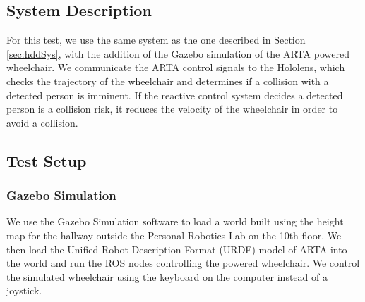\subsection{System Description}
For this test, we use the same system as the one described in Section \ref{sec:hddSys}, with the addition of the Gazebo simulation of the ARTA powered wheelchair. We communicate the ARTA control signals to the Hololens, which checks the trajectory of the wheelchair and determines if a collision with a detected person is imminent. If the reactive control system decides a detected person is a collision risk, it reduces the velocity of the wheelchair in order to avoid a collision.

\subsection{Test Setup}

\subsubsection{Gazebo Simulation}
We use the Gazebo Simulation software to load a world built using the height map for the hallway outside the Personal Robotics Lab on the 10th floor. We then load the Unified Robot Description Format (URDF) model of ARTA into the world and run the ROS nodes controlling the powered wheelchair. We control the simulated wheelchair using the keyboard on the computer instead of a joystick.

